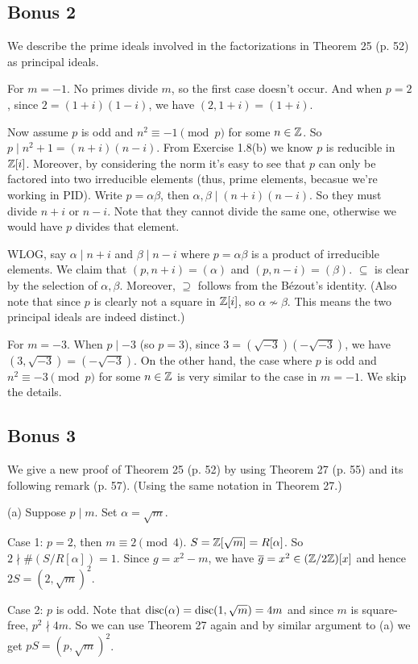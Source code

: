 \documentclass[../Marcus.tex]{subfiles}
\begin{document}
\subsection*{Bonus 2}

We describe the prime ideals involved in the factorizations in Theorem 25 (p. 52) as principal ideals.

For $m=-1$. No primes divide $m$, so the first case doesn't occur. And when $p=2$, since $2=(1+i)(1-i)$, we have $(2,1+i)=(1+i)$.

Now assume $p$ is odd and $n^2\equiv -1 \pmod{p}$ for some $n\in\mathbb{Z}$. So $p\mid n^2+1=(n+i)(n-i)$. From Exercise 1.8(b) we know $p$ is reducible in $\mathbb{Z}[i]$. Moreover, by considering the norm it's easy to see that $p$ can only be factored into two irreducible elements (thus, prime elements, becasue we're working in PID). Write $p=\alpha\beta$, then $\alpha,\beta\mid(n+i)(n-i)$. So they must divide $n+i$ or $n-i$. Note that they cannot divide the same one, otherwise we would have $p$ divides that element.

WLOG, say $\alpha\mid n+i$ and $\beta\mid n-i$ where $p=\alpha\beta$ is a product of irreducible elements. We claim that $(p,n+i)=(\alpha)$ and $(p,n-i)=(\beta)$. $\subseteq$ is clear by the selection of $\alpha,\beta$. Moreover, $\supseteq$ follows from the Bézout's identity. (Also note that since $p$ is clearly not a square in $\mathbb{Z}[i]$, so $\alpha\nsim\beta$. This means the two principal ideals are indeed distinct.)

For $m=-3$. When $p\mid -3$ (so $p=3$), since $3=(\sqrt{-3})(-\sqrt{-3})$, we have $(3,\sqrt{-3})=(-\sqrt{-3})$. On the other hand, the case where $p$ is odd and $n^2\equiv -3 \pmod{p}$ for some $n\in\mathbb{Z}$ is very similar to the case in $m=-1$. We skip the details.

\subsection*{Bonus 3}

We give a new proof of Theorem 25 (p. 52) by using Theorem 27 (p. 55) and its following remark (p. 57). (Using the same notation in Theorem 27.)

(a) Suppose $p\mid m$. Set $\alpha=\sqrt{m}$. 

Case 1: $p=2$, then $m\equiv 2 \pmod{4}$. $S=\mathbb{Z}[\sqrt{m}]=R[\alpha]$. So $2\nmid \#(S/R[\alpha])=1$. Since $g=x^2-m$, we have $\overline{g}=x^2\in(\mathbb{Z}/2\mathbb{Z})[x]$ and hence $2S=(2,\sqrt{m})^2$.

Case 2: $p$ is odd. Note that $\operatorname{disc}(\alpha)=\operatorname{disc}(1,\sqrt{m})=4m$ and since $m$ is square-free, $p^2\nmid 4m$. So we can use Theorem 27 again and by similar argument to (a) we get $pS=(p,\sqrt{m})^2$.
\end{document}
